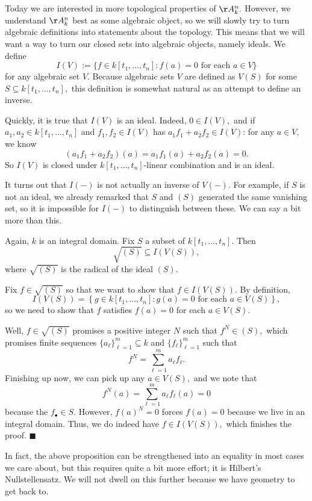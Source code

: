Today we are interested in more topological properties of $\AA_k^n.$ However, we understand $\AA_k^n$ best as some algebraic object, so we will slowly try to turn algebraic definitions into statements about the topology. This means that we will want a way to turn our closed sets into algebraic objects, namely ideals. We define
\[I(V):=\{f\in k[t_1,\ldots,t_n]:f(a)=0\text{ for each }a\in V\}\]
for any algebraic set $V.$ Because algebraic sets $V$ are defined as $V(S)$ for some $S\subseteq k[t_1,\ldots,t_n],$ this definition is somewhat natural as an attempt to define an inverse.

Quickly, it is true that $I(V)$ is an ideal. Indeed, $0\in I(V),$ and if $a_1,a_2\in k[t_1,\ldots,t_n]$ and $f_1,f_2\in I(V)$ has $a_1f_1+a_2f_2\in I(V)$: for any $a\in V,$ we know
\[(a_1f_1+a_2f_2)(a)=a_1f_1(a)+a_2f_2(a)=0.\]
So $I(V)$ is closed under $k[t_1,\ldots,t_n]$-linear combination and is an ideal.

It turns out that $I(-)$ is not actually an inverse of $V(-).$ For example, if $S$ is not an ideal, we already remarked that $S$ and $(S)$ generated the same vanishing set, so it is impossible for $I(-)$ to distinguish between these. We can say a bit more than this.
\begin{proposition}
    Again, $k$ is an integral domain. Fix $S$ a subset of $k[t_1,\ldots,t_n].$ Then
    \[\sqrt{(S)}\subseteq I(V(S)),\]
    where $\sqrt{(S)}$ is the radical of the ideal $(S).$
\end{proposition}
Fix $f\in\sqrt{(S)}$ so that we want to show that $f\in I(V(S)).$ By definition,
\[I(V(S))=\left\{g\in k[t_1,\ldots,t_n]:g(a)=0\text{ for each }a\in V(S)\right\},\]
so we need to show that $f$ satisfies $f(a)=0$ for each $a\in V(S).$

Well, $f\in\sqrt{(S)}$ promises a positive integer $N$ such that $f^N\in(S),$ which promises finite sequences $\{a_\ell\}_{\ell=1}^m\subseteq k$ and $\{f_\ell\}_{\ell=1}^m$ such that
\[f^N=\sum_{\ell=1}^ma_\ell f_\ell.\]
Finishing up now, we can pick up any $a\in V(S),$ and we note that
\[f^N(a)=\sum_{\ell=1}^ma_\ell f_\ell(a)=0\]
because the $f_\bullet\in S.$ However, $f(a)^N=0$ forces $f(a)=0$ because we live in an integral domain. Thus, we do indeed have $f\in I(V(S)),$ which finishes the proof. $\blacksquare$

In fact, the above proposition can be strengthened into an equality in most cases we care about, but this requires quite a bit more effort; it is Hilbert's Nullstellensatz. We will not dwell on this further because we have geometry to get back to.

